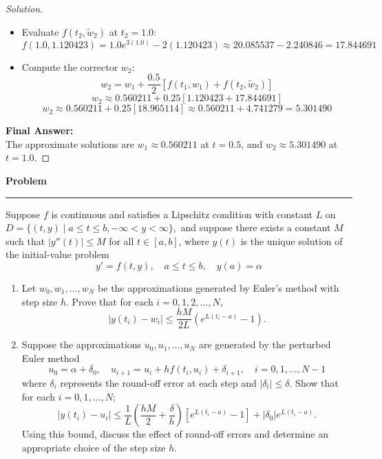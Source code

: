 \documentclass[11pt, a4paper]{article}
\newenvironment{problem}{%
  \begin{tcolorbox}[
    colback=blue!4!white,
    colframe=blue!38!black,
    boxrule=0.95pt,
    arc=3pt,
    left=11pt,
    right=11pt,
    top=10pt,
    bottom=11pt,
    before skip=12pt,
    after skip=14pt,
  ]
  \noindent\textbf{\textcolor{blue!35!black}{Problem}}\par\nointerlineskip
  {\color{blue!42!black}\rule{\linewidth}{0.55pt}}\par\vspace{0.55em}%
}{%
  \end{tcolorbox}%
}
\newif\ifsolutionnewpage
\newenvironment{solution}
  {\begin{proof}[Solution]}
  {\end{proof}\ifsolutionnewpage\newpage\fi}
\begin{document}
\begin{solution}
\begin{itemize}
        \item Evaluate $f(t_2, \tilde{w}_2)$ at $t_2 = 1.0$:
        $$ f(1.0, 1.120423) = 1.0 e^{3(1.0)} - 2(1.120423) \approx 20.085537 - 2.240846 = 17.844691 $$
    
        \item Compute the corrector $w_2$:
        $$ w_2 = w_1 + \frac{0.5}{2} [ f(t_1, w_1) + f(t_2, \tilde{w}_2) ] $$
        $$ w_2 \approx 0.560211 + 0.25 [ 1.120423 + 17.844691 ] $$
        $$ w_2 \approx 0.560211 + 0.25 [ 18.965114 ] \approx 0.560211 + 4.741279 = \mathbf{5.301490} $$
    \end{itemize}
    
    \textbf{Final Answer:} \\
    The approximate solutions are $w_1 \approx \mathbf{0.560211}$ at $t=0.5$, and $w_2 \approx \mathbf{5.301490}$ at $t=1.0$.
    \end{solution}

    
\begin{problem}
    Suppose $f$ is continuous and satisfies a Lipschitz condition with constant $L$ on
    $D = \{ (t,y) \mid a \le t \le b, -\infty < y < \infty \},$
    and suppose there exists a constant $M$ such that $|y''(t)| \le M$ for all $t \in [a,b]$, where $y(t)$ is the unique solution of the initial-value problem
    \begin{equation*}
    y' = f(t,y), \quad a \le t \le b, \quad y(a) = \alpha
    \end{equation*}
    \begin{enumerate}[label=(\alph*)]
        \item Let $w_0, w_1, ..., w_N$ be the approximations generated by Euler's method with step size $h$. Prove that for each $i=0,1,2,...,N$,
        \begin{equation*}
        |y(t_i) - w_i| \le \frac{hM}{2L}(e^{L(t_i-a)} - 1).
        \end{equation*}
        \item Suppose the approximations $u_0, u_1, ..., u_N$ are generated by the perturbed Euler method
        \begin{equation*}
        u_0 = \alpha + \delta_0, \quad u_{i+1} = u_i + hf(t_i, u_i) + \delta_{i+1}, \quad i=0,1,...,N-1
        \end{equation*}
        where $\delta_i$ represents the round-off error at each step and $|\delta_i| \le \delta$. Show that for each $i=0,1,...,N$;
        \begin{equation*}
        |y(t_i) - u_i| \le \frac{1}{L}\left(\frac{hM}{2} + \frac{\delta}{h}\right)[e^{L(t_i-a)} - 1] + |\delta_0|e^{L(t_i-a)}.
        \end{equation*}
        Using this bound, discuss the effect of round-off errors and determine an appropriate choice of the step size $h$.
    \end{enumerate}
    \end{problem}
    
\end{document}
